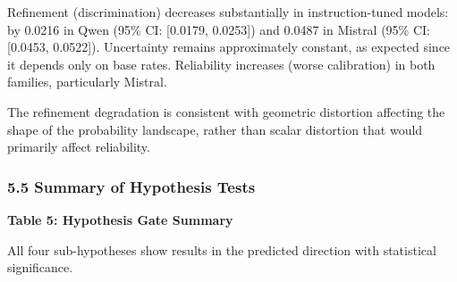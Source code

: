 \begin{table}[htbp]
\centering
{}
\end{table}

Refinement (discrimination) decreases substantially in instruction-tuned models: by 0.0216 in Qwen (95\% CI: [0.0179, 0.0253]) and 0.0487 in Mistral (95\% CI: [0.0453, 0.0522]). Uncertainty remains approximately constant, as expected since it depends only on base rates. Reliability increases (worse calibration) in both families, particularly Mistral.

The refinement degradation is consistent with geometric distortion affecting the shape of the probability landscape, rather than scalar distortion that would primarily affect reliability.

\subsubsection{5.5 Summary of Hypothesis Tests}

\textbf{Table 5: Hypothesis Gate Summary}

\begin{table}[htbp]
\centering
{}
\end{table}

All four sub-hypotheses show results in the predicted direction with statistical significance.
